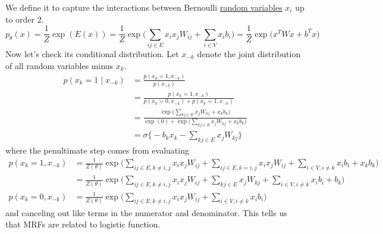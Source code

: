 \documentclass{article}
\begin{document}
  \begin{example}
    \label{ex:bernoulli-pairwise-markov-random-fields}
    We define it to capture the interactions between Bernoulli \hyperref[prob-def:random-variable]{random variables} $x_i$ up to order $2$. 
    \begin{equation}
      p_{\theta} (x) = \frac{1}{Z} \exp( E(x)) = \frac{1}{Z} \exp \bigg( \sum_{i j \in E} x_i x_j W_{ij} + \sum_{i \in V} x_i b_i \bigg) = \frac{1}{Z} \exp \big( x^T W x + b^T x \big)
    \end{equation}
    Now let's check its conditional distribution. Let $x_{-k}$ denote the joint distribution of all random variables minus $x_k$.  
    \begin{align}
      p(x_k = 1 \mid x_{-k}) & = \frac{p(x_k = 1, x_{-k})}{p(x_{-k})} \\
                             & = \frac{p(x_k = 1, x_{-k})}{p(x_k = 0, x_{-k}) + p(x_k = 1, x_{-k})} \\
                             & = \frac{\exp \Big( \sum_{k j \in E} x_j W_{kj} + x_k b_k \Big)}{\exp(0) + \exp \Big(\sum_{k j \in E} x_j W_{kj} + x_k b_k \Big)} \\
                             & = \sigma \bigg\{ - b_k x_k - \sum_{k j \in E} x_j W_{k j} \bigg\} 
    \end{align}
    where the penultimate step comes from evaluating 
    \begin{align} 
      p(x_k = 1, x_{-k}) & = \frac{1}{Z(\theta)} \exp \bigg( \sum_{ij \in E, k \neq i, j} x_i x_j W_{ij} + \sum_{i j \in E, k = i, j} x_i x_j W_{ij} + \sum_{i \in V, i \neq k} x_i b_i + x_k b_k \bigg) \\
                         & =\frac{1}{Z(\theta)} \exp \bigg( \sum_{ij \in E, k \neq i, j} x_i x_j W_{ij} + \sum_{k j \in E} x_j W_{kj} + \sum_{i \in V, i \neq k} x_i b_i + b_k \bigg)  \\ 
      p(x_k = 0, x_{-k}) & = \frac{1}{Z(\theta)} \exp \bigg( \sum_{ij \in E, k \neq i, j} x_i x_j W_{ij} + \sum_{i \in V, i \neq k} x_i b_i\bigg)  
    \end{align}
    and canceling out like terms in the numerator and denominator. This tells us that MRFs are related to logistic function.  
  \end{example}
\end{document}

